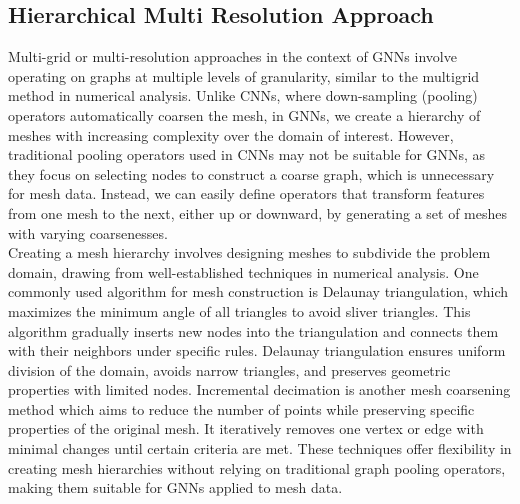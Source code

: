 \subsection{Hierarchical Multi Resolution Approach}
Multi-grid or multi-resolution approaches in the context of GNNs involve operating on graphs at multiple levels of granularity, similar to the multigrid method in numerical analysis. 
Unlike CNNs, where down-sampling (pooling) operators automatically coarsen the mesh, in GNNs, we create a hierarchy of meshes with increasing complexity over the domain of interest. However, traditional pooling operators used in CNNs may not be suitable for GNNs, as they focus on selecting nodes to construct a coarse graph, which is unnecessary for mesh data. Instead, we can easily define operators that transform features from one mesh to the next, either up or downward, by generating a set of meshes with varying coarsenesses.\\
Creating a mesh hierarchy involves designing meshes to subdivide the problem domain, drawing from well-established techniques in numerical analysis. One commonly used algorithm for mesh construction is Delaunay triangulation, which maximizes the minimum angle of all triangles to avoid sliver triangles. This algorithm gradually inserts new nodes into the triangulation and connects them with their neighbors under specific rules. Delaunay triangulation ensures uniform division of the domain, avoids narrow triangles, and preserves geometric properties with limited nodes. Incremental decimation is another mesh coarsening method which aims to reduce the number of points while preserving specific properties of the original mesh. It iteratively removes one vertex or edge with minimal changes until certain criteria are met. These techniques offer flexibility in creating mesh hierarchies without relying on traditional graph pooling operators, making them suitable for GNNs applied to mesh data.\\
